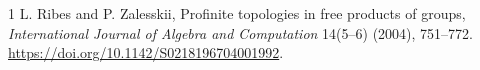 \documentclass[11pt]{article}
\begin{document}

\begin{thebibliography}{1}
 L. Ribes and P. Zalesskii,
Profinite topologies in free products of groups,
\emph{International Journal of Algebra and Computation} 14(5--6) (2004), 751--772.
\url{https://doi.org/10.1142/S0218196704001992}.
\end{thebibliography}
\end{document}
